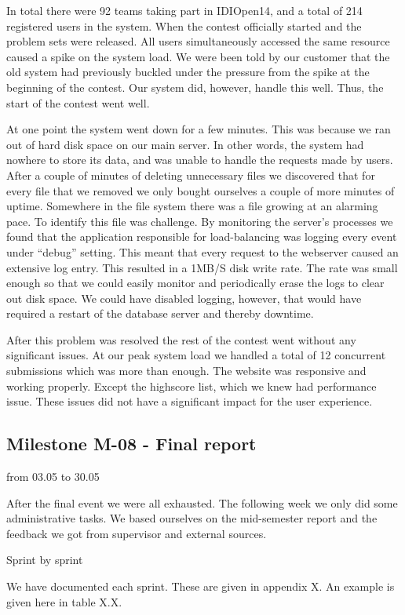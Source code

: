 In total there were 92 teams taking part in IDIOpen14, and a total of
214 registered users in the system. When the contest officially started
and the problem sets were released. All users simultaneously accessed
the same resource caused a spike on the system load. We were been told
by our customer that the old system had previously buckled under the
pressure from the spike at the beginning of the contest. Our system
did, however, handle this well. Thus, the start of the contest went
well. 




At one point the system went down for a few minutes. This was because we
ran out of hard disk space on our main server. In other words, the
system had nowhere to store its data, and was unable to handle the
requests made by users. After a couple of minutes of deleting
unnecessary files we discovered that for every file that we removed we
only bought ourselves a couple of more minutes of uptime. Somewhere in
the file system there was a file growing at an alarming pace. To
identify this file was challenge. By monitoring the
server's processes we found that the application
responsible for load-balancing was logging every event under
``debug'' setting. This meant that
every request to the webserver caused an extensive log entry. This
resulted in a 1MB/S disk write rate. The rate was small enough so that
we could easily monitor and periodically erase the logs to clear out
disk space. We could have disabled logging, however, that would have
required a restart of the database server and thereby downtime. 




After this problem was resolved the rest of the contest went without any
significant issues. At our peak system load we handled a total of 12
concurrent submissions which was more than enough. The website was
responsive and working properly. Except the highscore list, which we
knew had performance issue. These issues did not have a significant
impact for the user experience.




\subsection{Milestone M-08 - Final report}

from 03.05 to 30.05

After the final event we were all exhausted. The following week we only
did some administrative tasks. We based ourselves on the mid-semester
report and the feedback we got from supervisor and external sources. 




Sprint by sprint

We have documented each sprint. These are given in appendix X. An
example is given here in table X.X.\newline

